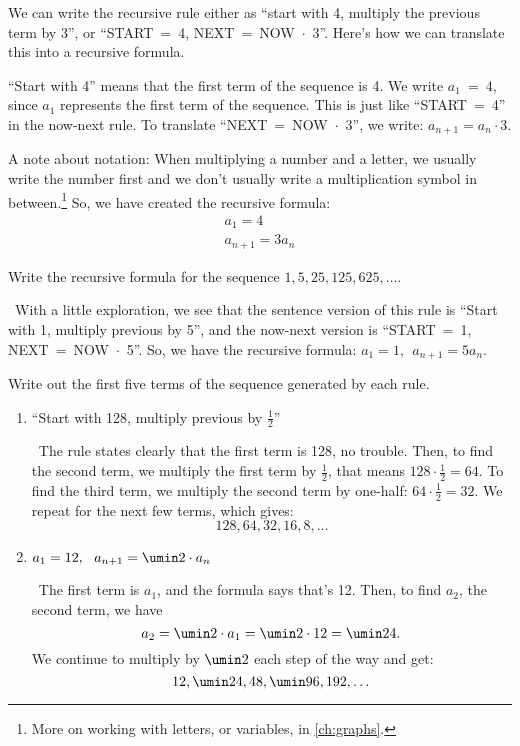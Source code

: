 We can write the recursive rule either as ``start with 4, multiply the previous term by 3'', or ``START~=~4, NEXT~=~NOW~$\cdot$~3''. Here's how we can translate this into a recursive formula.

``Start with 4'' means that the first term of the sequence is 4. We write $a_1~=~4$, since $a_1$ represents the first term of the sequence. This is just like ``START~=~4'' in the now-next rule. To translate ``NEXT~=~NOW~$\cdot$~3'', we write: $a_{n+1}=a_n\cdot3$.

A note about notation: When multiplying a number and a letter, we usually write the number first and we don't usually write a multiplication symbol in between.\footnote{More on working with letters, or variables, in \cref{ch:graphs}.} So, we have created the recursive formula: \[\begin{array}{c}a_1=4 \\ a_{n+1}=3a_n\end{array}\]

\begin{boxedex}
Write the recursive formula for the sequence $1, 5, 25, 125, 625, \dotsc$.

\exsoln\ With a little exploration, we see that the sentence version of this rule is ``Start with 1, multiply previous by 5'', and the now-next version is ``START~=~1, NEXT~=~NOW~$\cdot$~5''. So, we have the recursive formula: $a_1 = 1, ~~ a_{n+1}=5a_n$.
\end{boxedex}
 
\begin{boxedex}
Write out the first five terms of the sequence generated by each rule.

\begin{enumerate}
\item ``Start with 128, multiply previous by $\frac{1}{2}$''

\exsoln\ The rule states clearly that the first term is 128, no trouble. Then, to find the second term, we multiply the first term by $\frac{1}{2}$, that means $128 \cdot \frac{1}{2} = 64$. To find the third term, we multiply the second term by one-half: $64 \cdot \frac{1}{2} = 32$. We repeat for the next few terms, which gives:\[128, 64, 32, 16, 8, \dotsc\]

\item $a_1 = 12, ~~ a_{n+1} = \umin2\cdot a_n$

\exsoln\ The first term is $a_1$, and the formula says that's 12. Then, to find $a_2$, the second term, we have \[a_2 = \umin2 \cdot a_1 = \umin2 \cdot 12 = \umin24.\] We continue to multiply by $\umin2$ each step of the way and get:\[12, \umin24, 48, \umin96, 192, \dotsc\]
\end{enumerate}
\end{boxedex}


